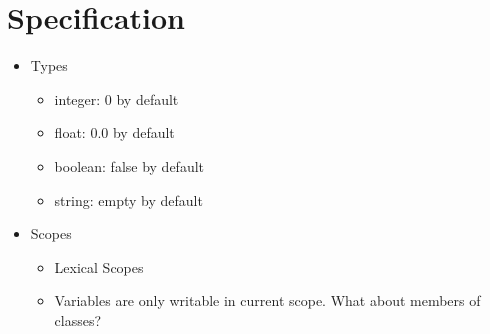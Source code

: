 \documentclass[a4paper,12pt]{article}
\begin{document}
\section{Specification}
\begin{itemize}
	\item Types
  	\begin{itemize}
  		\item integer: 0 by default
  		\item float: 0.0 by default
  		\item boolean: false by default
  		\item string: empty by default
  	\end{itemize} 
  	\item Scopes
  	\begin{itemize}
  		\item Lexical Scopes
  		\item Variables are only writable in current scope. What about members of classes?
  	\end{itemize}
\end{itemize}
\end{document}
